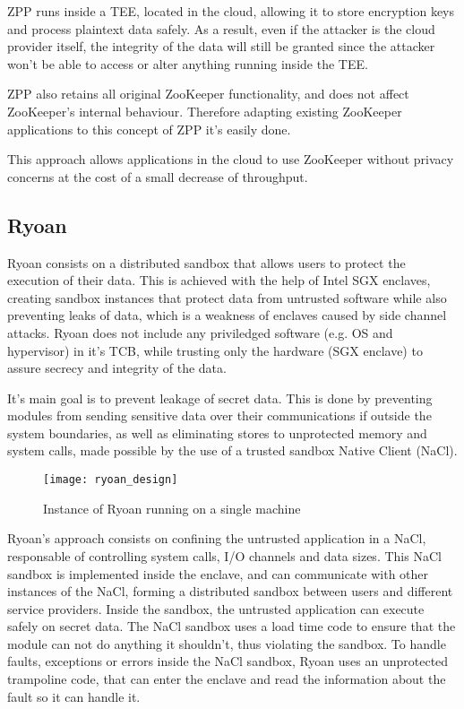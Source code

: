 ZPP runs inside a TEE, located in the cloud, allowing it to store encryption keys and process plaintext data safely. As a result, even if the attacker is the cloud provider itself, the integrity of the data will still be granted since the attacker won't be able to access or alter anything running inside the TEE.

ZPP also retains all original ZooKeeper functionality, and does not affect ZooKeeper's internal behaviour. Therefore adapting existing ZooKeeper applications to this concept of ZPP it's easily done.

This approach allows applications in the cloud to use ZooKeeper without privacy concerns at the cost of a small decrease of throughput.
\subsection{Ryoan}
\label{ssec:ryoan_sandboxing}

Ryoan \cite{ryoanPaper} consists on a distributed sandbox that allows users to protect the execution of their data. This is achieved with the help of Intel SGX \cite{intelSGX} \cite{sgxPaper} enclaves, creating sandbox instances that protect data from untrusted software while also preventing leaks of data, which is a weakness of enclaves caused by side channel attacks.
Ryoan does not include any priviledged software (e.g. OS and hypervisor) in it's TCB, while trusting only the hardware (SGX enclave) to assure secrecy and integrity of the data.

It's main goal is to prevent leakage of secret data. This is done by preventing modules from sending sensitive data over their communications if outside the system boundaries, as well as eliminating stores to unprotected memory and system calls, made possible by the use of a trusted sandbox Native Client (NaCl). 

\begin{figure}[htbp]
	\centering
	{\texttt{[image: ryoan\_design]}}%
	\caption{Instance of Ryoan running on a single machine}
\end{figure}

Ryoan's approach consists on confining the untrusted application in a NaCl, responsable of controlling system calls, I/O channels and data sizes. This NaCl sandbox is implemented inside the enclave, and can communicate with other instances of the NaCl, forming a distributed sandbox between users and different service providers. Inside the sandbox, the untrusted application can execute safely on secret data. The NaCl sandbox uses a load time code to ensure that the module can not do anything it shouldn't, thus violating the sandbox. To handle faults, exceptions or errors inside the NaCl sandbox, Ryoan uses an unprotected trampoline code, that can enter the enclave and read the information about the fault so it can handle it.
